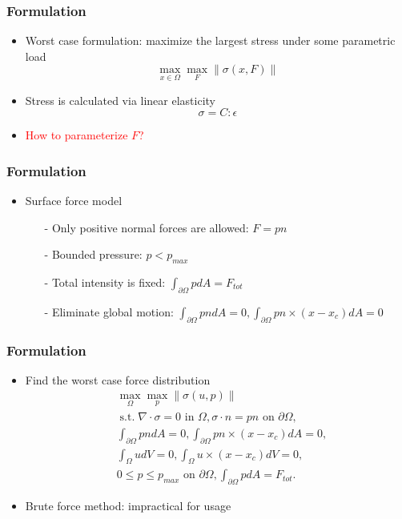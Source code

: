 \documentclass[serif,mathserif, 12pt]{beamer}
\newcommand{\TODO}[1]{\textcolor{red}{#1}}
\DeclareMathOperator{\ST}{s.t.}
\begin{document}
\begin{frame}
  \frametitle{Formulation}
  \begin{itemize}
  \item Worst case formulation: maximize the largest stress under some parametric load
    \pause
    \begin{equation*}
      \boxed{
        \max_{x\in\Omega} \max_{F} \|\sigma(x, F) \|
        }
    \end{equation*}
    \pause
  \item Stress is calculated via linear elasticity
    \begin{equation*}
      \sigma = C:\epsilon
    \end{equation*}
    \pause
  \item \TODO{How to parameterize $F$?}
  \end{itemize}
\end{frame}

\begin{frame}
  \frametitle{Formulation}
  \begin{itemize}
  \item Surface force model
    \begin{itemize}
      \pause
    \item[-] Only positive normal forces are allowed: $F = pn$
      \pause
    \item[-] Bounded pressure: $p < p_{max}$
      \pause
    \item[-] Total intensity is fixed: $\int_{\partial \Omega} pdA  = F_{tot}$
      \pause
    \item[-] Eliminate global motion: $\int_{\partial\Omega} pndA= 0, \int_{\partial \Omega}pn\times (x-x_c)dA = 0$
    \end{itemize}
  \end{itemize}
\end{frame}

\begin{frame}
  \frametitle{Formulation}
  \begin{itemize}
  \item Find the worst case force distribution
    \begin{equation*}
      \begin{split}
        &\max_\Omega \max_p \|\sigma(u, p) \| \\
        &\ST \nabla\cdot \sigma  = 0 \text{ in } \Omega, \sigma\cdot n  = pn \text{ on } \partial \Omega, \\
        &\int_{\partial \Omega} pndA = 0, \int_{\partial\Omega} pn\times (x-x_c)dA = 0, \\
        &\int_{\Omega} u dV = 0, \int_{\Omega} u\times(x-x_c) dV = 0, \\
        & 0 \le p \le p_{max} \text{ on } \partial \Omega, \int_{\partial \Omega} pdA = F_{tot}.
      \end{split}
    \end{equation*}
    \pause
  \item Brute force method: impractical for usage
  \end{itemize}
\end{frame}
\end{document}
